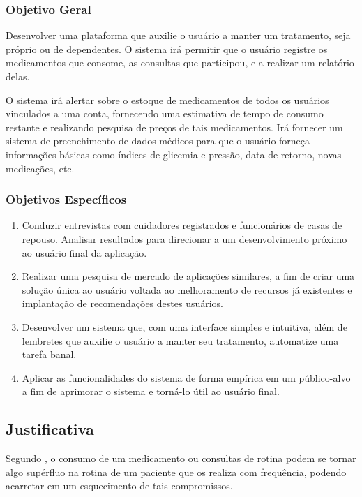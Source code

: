 \documentclass[
	article,			%
	12pt,				%
	oneside,			%
	a4paper,			%
    BIBLATEX,           %
	english,			%
	brazil,				%
	sumario=tradicional
	]{abntex2}
\begin{document}
\subsubsection{Objetivo Geral}

Desenvolver uma plataforma que auxilie o usuário a manter um tratamento, seja próprio ou de dependentes. O sistema irá permitir que o usuário registre os medicamentos que consome, as consultas que participou, e a realizar um relatório delas.

O sistema irá alertar sobre o estoque de medicamentos de todos os usuários vinculados a uma conta, fornecendo uma estimativa de tempo de consumo restante e realizando pesquisa de preços de tais medicamentos. Irá fornecer um sistema de preenchimento de dados médicos para que o usuário forneça informações básicas como índices de glicemia e pressão, data de retorno, novas medicações, etc.

\subsubsection{Objetivos Específicos}

\begin{enumerate}
    \item Conduzir entrevistas com cuidadores registrados e funcionários de casas de repouso. Analisar resultados para direcionar a um desenvolvimento próximo ao usuário final da aplicação.
    \item Realizar uma pesquisa de mercado de aplicações similares, a fim de criar uma solução única ao usuário voltada ao melhoramento de recursos já existentes e implantação de recomendações destes usuários. 
    \item Desenvolver um sistema que, com uma interface simples e intuitiva, além de lembretes que auxilie o usuário a manter seu tratamento, automatize uma tarefa banal.
    \item Aplicar as funcionalidades do sistema de forma empírica em um público-alvo a fim de aprimorar o sistema e torná-lo útil ao usuário final.
\end{enumerate}


\subsection{Justificativa}    

Segundo , o consumo de um medicamento ou consultas de rotina podem se tornar algo supérfluo na rotina de um paciente que os realiza com frequência, podendo acarretar em um esquecimento de tais compromissos. 
\end{document}
